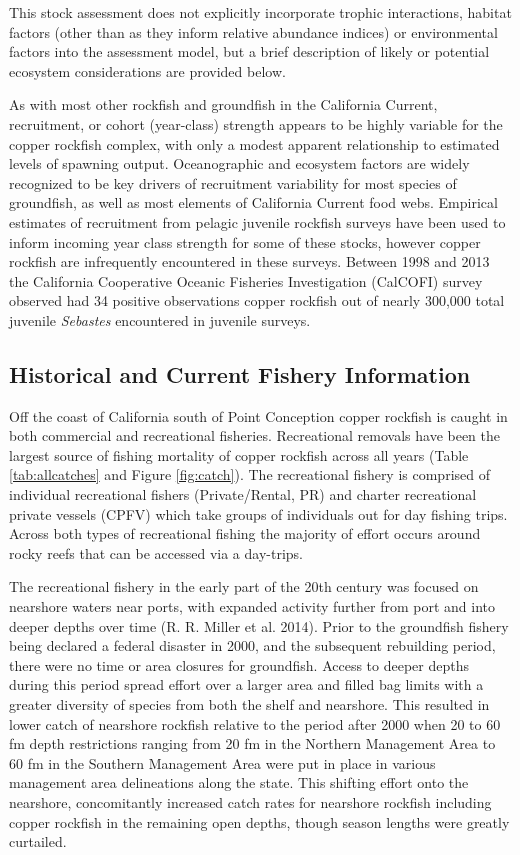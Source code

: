 \documentclass[11pt,
  english,
  letterpaper,
]{article}
\begin{document}
This stock assessment does not explicitly incorporate trophic interactions, habitat factors (other than as they inform relative abundance indices) or environmental factors into the assessment model, but a brief description of likely or potential ecosystem considerations are provided below.

As with most other rockfish and groundfish in the California Current, recruitment, or cohort (year-class) strength appears to be highly variable for the copper rockfish complex, with only a modest apparent relationship to estimated levels of spawning output. Oceanographic and ecosystem factors are widely recognized to be key drivers of recruitment variability for most species of groundfish, as well as most elements of California Current food webs. Empirical estimates of recruitment from pelagic juvenile rockfish surveys have been used to inform incoming year class strength for some of these stocks, however copper rockfish are infrequently encountered in these surveys. Between 1998 and 2013 the California Cooperative Oceanic Fisheries Investigation (CalCOFI) survey observed had 34 positive observations copper rockfish out of nearly 300,000 total juvenile \emph{Sebastes} encountered in juvenile surveys.

\hypertarget{historical-and-current-fishery-information}{%
\subsection{Historical and Current Fishery Information}\label{historical-and-current-fishery-information}}

Off the coast of California south of Point Conception copper rockfish is caught in both commercial and recreational fisheries. Recreational removals have been the largest source of fishing mortality of copper rockfish across all years (Table \ref{tab:allcatches} and Figure \ref{fig:catch}). The recreational fishery is comprised of individual recreational fishers (Private/Rental, PR) and charter recreational private vessels (CPFV) which take groups of individuals out for day fishing trips. Across both types of recreational fishing the majority of effort occurs around rocky reefs that can be accessed via a day-trips.

The recreational fishery in the early part of the 20th century was focused on nearshore waters near ports, with expanded activity further from port and into deeper depths over time (R. R. Miller et al. 2014). Prior to the groundfish fishery being declared a federal disaster in 2000, and the subsequent rebuilding period, there were no time or area closures for groundfish. Access to deeper depths during this period spread effort over a larger area and filled bag limits with a greater diversity of species from both the shelf and nearshore. This resulted in lower catch of nearshore rockfish relative to the period after 2000 when 20 to 60 fm depth restrictions ranging from 20 fm in the Northern Management Area to 60 fm in the Southern Management Area were put in place in various management area delineations along the state. This shifting effort onto the nearshore, concomitantly increased catch rates for nearshore rockfish including copper rockfish in the remaining open depths, though season lengths were greatly curtailed.
\end{document}
